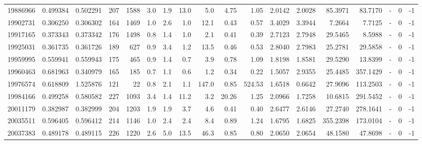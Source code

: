 \begin{tabular}{rrrrrrrrrrrrrrrlrr}
  19886966 & 0.499384 &   0.502291 &  207 & 1588 &      3.0 &      1.9 &    13.0 &      5.0 &       4.75 &        1.05 &  2.0142 &  2.0028 &   85.3971 &   83.7170 &             - &        0 &         -1 \\
  19902731 & 0.306250 &   0.306302 &  164 & 1469 &      1.0 &      2.6 &     1.0 &     12.1 &       0.43 &        0.57 &  3.4029 &  3.3944 &    7.2664 &    7.7125 &             - &        0 &         -1 \\
  19917165 & 0.373343 &   0.373342 &  176 & 1498 &      0.8 &      1.4 &     1.0 &      2.1 &       0.41 &        0.39 &  2.7123 &  2.7948 &   29.5465 &    8.5988 &             - &        0 &         -1 \\
  19925031 & 0.361735 &   0.361726 &  189 &  627 &      0.9 &      3.4 &     1.2 &     13.5 &       0.46 &        0.53 &  2.8040 &  2.7983 &   25.2781 &   29.5858 &             - &        0 &         -1 \\
  19959995 & 0.559941 &   0.559943 &  175 &  465 &      0.9 &      1.4 &     0.7 &      3.9 &       0.78 &        1.09 &  1.8198 &  1.8581 &   29.5290 &   13.8399 &             - &        0 &         -1 \\
  19960463 & 0.681963 &   0.340979 &  165 &  185 &      0.7 &      1.1 &     0.6 &      1.2 &       0.34 &        0.22 &  1.5057 &  2.9355 &   25.4485 &  357.1429 &             - &        0 &         -1 \\
  19976574 & 0.618809 &   1.525876 &  121 &   22 &      0.8 &      2.1 &     1.1 &    147.0 &       0.85 &      524.53 &  1.6518 &  0.6642 &   27.9096 &  113.2503 &             - &        0 &         -1 \\
  19984166 & 0.499258 &   0.580582 &  227 & 1093 &      3.4 &      1.4 &    11.2 &      3.2 &      20.26 &        1.25 &  2.0966 &  1.7258 &   10.6815 &  291.5452 &             - &        0 &         -1 \\
  20011179 & 0.382987 &   0.382999 &  204 & 1203 &      1.9 &      1.9 &     3.7 &      4.6 &       0.41 &        0.40 &  2.6477 &  2.6146 &   27.2740 &  278.1641 &             - &        0 &         -1 \\
  20035511 & 0.596405 &   0.596412 &  214 & 1146 &      1.0 &      2.4 &     2.4 &      8.4 &       0.89 &        1.24 &  1.6795 &  1.6825 &  355.2398 &  173.0104 &             - &        0 &         -1 \\
  20037383 & 0.489178 &   0.489115 &  226 & 1220 &      2.6 &      5.0 &    13.5 &     46.3 &       0.85 &        0.80 &  2.0650 &  2.0654 &   48.1580 &   47.8698 &             - &        0 &         -1 \\

\end{tabular}

